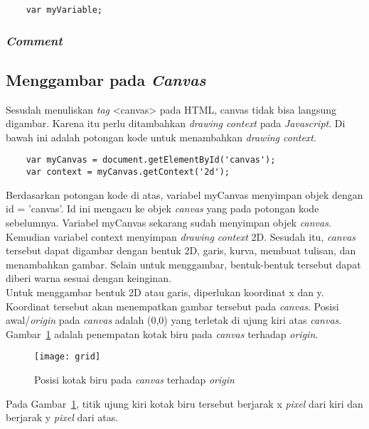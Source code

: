 \begin{lstlisting}
	var myVariable;
\end{lstlisting}

\subsubsection{\textit{Comment}}


\subsection{Menggambar pada \textit{Canvas}}
Sesudah menuliskan \textit{tag} <canvas> pada HTML, canvas tidak bisa langsung digambar. Karena itu perlu ditambahkan \textit{drawing context} pada \textit{Javascript}. Di bawah ini adalah potongan kode untuk menambahkan \textit{drawing context}.

\begin{lstlisting}
	var myCanvas = document.getElementById('canvas');
	var context = myCanvas.getContext('2d');
\end{lstlisting}

Berdasarkan potongan kode di atas, variabel myCanvas menyimpan objek dengan id = 'canvas'. Id ini mengacu ke objek \textit{canvas} yang pada potongan kode sebelumnya. Variabel myCanvas sekarang sudah menyimpan objek \textit{canvas}. Kemudian variabel context menyimpan \textit{drawing context} 2D. Sesudah itu, \textit{canvas} tersebut dapat digambar dengan bentuk 2D, garis, kurva, membuat tulisan, dan menambahkan gambar. Selain untuk menggambar, bentuk-bentuk tersebut dapat diberi warna sesuai dengan keinginan.\\

Untuk menggambar bentuk 2D atau garis, diperlukan koordinat x dan y. Koordinat tersebut akan menempatkan gambar tersebut pada \textit{canvas}. Posisi awal/\textit{origin} pada \textit{canvas} adalah (0,0) yang terletak di ujung kiri atas \textit{canvas}. Gambar~\ref{fig:grid} adalah penempatan kotak biru pada \textit{canvas} terhadap \textit{origin}.

\begin{figure}[H]
	\centering  
	\texttt{[image: grid]}
	\caption[Posisi kotak biru pada \textit{canvas} terhadap \textit{origin}]{Posisi kotak biru pada \textit{canvas} terhadap \textit{origin}}
	\label{fig:grid} 
\end{figure} 

Pada Gambar~\ref{fig:grid}, titik ujung kiri kotak biru tersebut berjarak x \textit{pixel} dari kiri dan berjarak y \textit{pixel} dari atas. 

